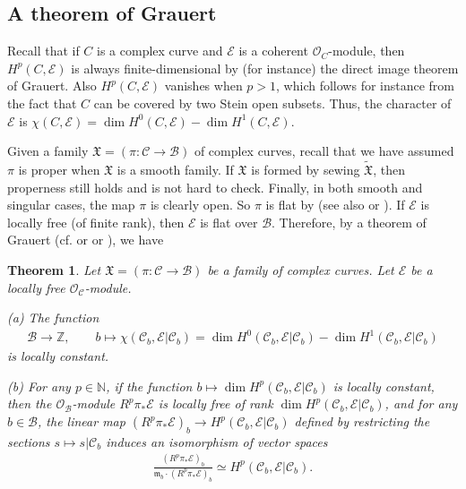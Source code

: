 \documentclass[12pt,a4paper,notitlepage]{article}
\theoremstyle{definition}
\theoremstyle{plain}
\newtheorem{thm}[df]{Theorem}
\newcommand{\fk}{\mathfrak}
\newcommand{\mc}{\mathcal}
\newcommand{\wtd}{\widetilde}
\newcommand{\scr}{\mathscr}
\numberwithin{equation}{section}
\begin{document}
\subsection*{A theorem of Grauert}

Recall that if $C$ is a complex curve and $\scr E$ is a coherent $\scr O_C$-module, then  $H^p(C,\scr E)$ is always finite-dimensional by (for instance) the direct image theorem of Grauert. Also $H^p(C,\scr E)$ vanishes when $p>1$, which follows for instance from the fact that $C$ can be covered by two Stein open subsets. Thus, the character of $\scr E$ is $\chi(C,\scr E)=\dim H^0(C,\scr E)-\dim H^1(C,\scr E)$.


Given a family $\fk X=(\pi:\mc C\rightarrow\mc B)$ of complex curves, recall that we have assumed $\pi$ is proper when $\fk X$ is a smooth family. If $\fk X$ is formed by sewing $\wtd{\fk X}$, then properness still holds and is not hard to check. Finally, in both smooth and singular cases, the map $\pi$ is clearly open. So $\pi$ is flat by  \cite[Sec. 3.20]{Fis76} (see also \cite[Thm. II.2.13]{GPR94} or \cite[Thm. V.2.13]{BS76}). If $\scr E$ is locally free (of finite rank), then $\scr E$ is flat over $\mc B$. Therefore, by a theorem of Grauert \cite{Gra60} (cf. \cite[Thm. III.4.7]{GPR94} or \cite[Thm. III.4.12]{BS76} or \cite[Thm. 9.4.8]{EP96}), we have

\begin{thm}\label{lb11}
Let $\fk X=(\pi:\mc C\rightarrow\mc B)$ be a family of complex curves. Let $\scr E$ be a locally free $\scr O_{\mc C}$-module.

(a) The function
\begin{gather*}
\mc B\rightarrow \mathbb Z, \qquad b\mapsto\chi(\mc C_b,\scr E|\mc C_b)=\dim H^0(\mc C_b,\scr E|\mc C_b)-\dim H^1(\mc C_b,\scr E|\mc C_b)
\end{gather*}
is locally constant. 

(b) For any $p\in\mathbb N$, if the function  $b\mapsto\dim H^p(\mc C_b,\scr E|\mc C_b)$ is  locally constant, then the $\scr O_{\mc B}$-module $R^p\pi_*\scr E$ is  locally free of rank $\dim H^p(\mc C_b,\scr E|\mc C_b)$, and for any $b\in\mc B$, the linear map $(R^p\pi_*\scr E)_b\rightarrow H^p(\mc C_b,\scr E|\mc C_b)$ defined by  restricting the sections $s\mapsto s|{\mc C_b}$ induces an isomorphism of vector spaces
\begin{align*}
\frac{(R^p\pi_*\scr E)_b}{\fk m_b\cdot (R^p\pi_*\scr E)_b}\simeq H^p(\mc C_b,\scr E|\mc C_b).
\end{align*}
\end{thm}
\end{document}
